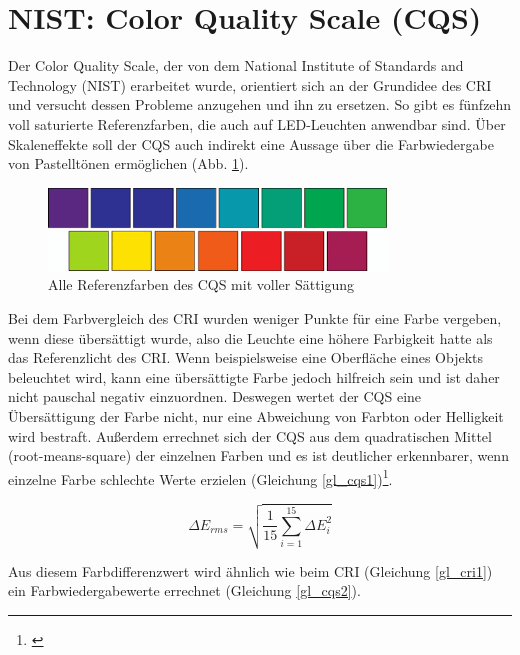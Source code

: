 \section{NIST: Color Quality Scale (CQS)} \label{sec_cqs}

Der Color Quality Scale, der von dem National Institute of Standards and Technology (NIST) erarbeitet wurde, orientiert sich an der Grundidee des CRI und versucht dessen Probleme anzugehen und ihn zu ersetzen. So gibt es fünfzehn voll saturierte Referenzfarben, die auch auf LED-Leuchten anwendbar sind. Über Skaleneffekte soll der CQS auch indirekt eine Aussage über die Farbwiedergabe von Pastelltönen ermöglichen (Abb. \ref{b_cqs1}). 

\begin{figure}[htp]     %
\centering
\includegraphics[width=0.8\textwidth]{bilder/cqs} 
\caption {Alle Referenzfarben des CQS mit voller Sättigung\protect\footnotemark}\label{b_cqs1}
\end{figure}

Bei dem Farbvergleich des CRI wurden weniger Punkte für eine Farbe vergeben, wenn diese übersättigt wurde, also die Leuchte eine höhere Farbigkeit hatte als das Referenzlicht des CRI. Wenn beispielsweise eine Oberfläche eines Objekts beleuchtet wird, kann eine übersättigte Farbe jedoch hilfreich sein und ist daher nicht pauschal negativ einzuordnen. Deswegen wertet der CQS eine Übersättigung der Farbe nicht, nur eine Abweichung von Farbton oder Helligkeit wird bestraft. Außerdem errechnet sich der CQS aus dem quadratischen Mittel (root-means-square) der einzelnen Farben und es ist deutlicher erkennbarer, wenn einzelne Farbe schlechte Werte erzielen (Gleichung \ref{gl_cqs1})\footnote{\cite{davis_ohno}}.

\begin{equation}\label{gl_cqs1}
		\Delta E_{rms} = \sqrt{\frac{1}{15} \sum_{i=1}^{15} \Delta E_{i} ^{2}} 
\end{equation}

Aus diesem Farbdifferenzwert wird ähnlich wie beim CRI (Gleichung \ref{gl_cri1}) ein Farbwiedergabewerte errechnet (Gleichung \ref{gl_cqs2}).

